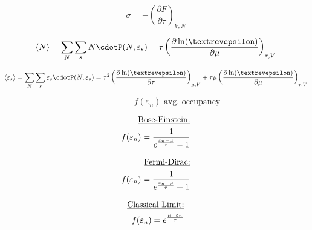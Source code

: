 \documentclass[12pt]{article}
\begin{document}
\vspace{-30pt}

\begin{multicols}{2}

  \begin{equation*}
    \sigma=-\left( \frac{\partial F}{\partial \tau} \right)_{V,N}
  \end{equation*}

  \begin{equation*}
    \langle N\rangle=\sum_N\sum_sN\cdotP(N,\varepsilon_s)=\tau\left( \frac{\partial \ln(\text{\textrevepsilon})}{\partial\mu} \right)_{\tau,V}
  \end{equation*}

\end{multicols}

\begin{multicols}{2}

  \begin{equation*}
    \langle \varepsilon_s\rangle=\sum_N\sum_s\varepsilon_s\cdotP(N,\varepsilon_s)=\tau^2\left( \frac{\partial \ln(\text{\textrevepsilon})}{\partial\tau} \right)_{\mu,V}+\tau\mu\left( \frac{\partial\ln(\text{\textrevepsilon})}{\partial\mu} \right)_{\tau,V}
  \end{equation*}


  \begin{equation*}
  \hspace{60pt}
    f(\varepsilon_n) \text{ avg. occupancy}
  \end{equation*}

\end{multicols}

\vspace{-25pt}

\begin{multicols}{3}

  \begin{equation*}
    \begin{split}
    \text{\underline{Bose-Einstein:}}\\
    f(\varepsilon_n)=\frac{1}{e^{\frac{\varepsilon_n-\mu}{\tau}}-1}
    \end{split}
  \end{equation*}

  \begin{equation*}
    \begin{split}
    \text{\underline{Fermi-Dirac:}}\\
    f(\varepsilon_n)=\frac{1}{e^{\frac{\varepsilon_n-\mu}{\tau}}+1}
    \end{split}
  \end{equation*}

  \begin{equation*}
    \begin{split}
    \text{\underline{Classical Limit:}}\\
    f(\varepsilon_n)=e^{\frac{\mu-\varepsilon_n}{\tau}}
    \end{split}
  \end{equation*}

\end{multicols}
\end{document}

